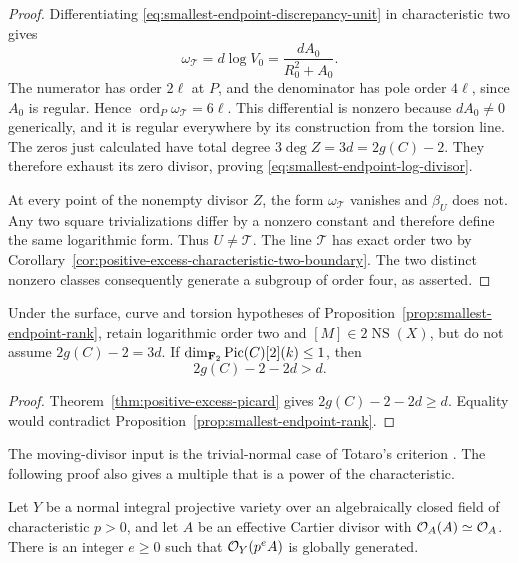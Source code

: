\begin{proof}
Differentiating \eqref{eq:smallest-endpoint-discrepancy-unit} in
characteristic two gives
\begin{equation}\label{eq:smallest-endpoint-discrepancy-log}
 \omega_{\mathcal T}=d\log V_0
      =\frac{dA_0}{R_0^2+A_0}.
\end{equation}
The numerator has order $2\ell$ at $P$, and the denominator has
pole order $4\ell$, since $A_0$ is regular.  Hence
$\operatorname{ord}_P\omega_{\mathcal T}=6\ell$.
This differential is nonzero because $dA_0\ne0$ generically, and it
is regular everywhere by its construction from the torsion line.
The zeros just calculated have total degree
$3\deg Z=3d=2g(C)-2$.  They therefore exhaust its zero divisor,
proving \eqref{eq:smallest-endpoint-log-divisor}.

At every point of the nonempty divisor $Z$, the form
$\omega_{\mathcal T}$ vanishes and $\beta_U$ does not.
Any two square trivializations differ by a nonzero constant and
therefore define the same logarithmic form.  Thus $U\ne\mathcal T$.
The line $\mathcal T$ has exact order two by
Corollary~\ref{cor:positive-excess-characteristic-two-boundary}.
The two distinct nonzero classes consequently generate a subgroup
of order four, as asserted.
\end{proof}

\begin{corollary}\label{cor:smallest-endpoint-rank-strictness}
Under the surface, curve and torsion hypotheses of
Proposition~\ref{prop:smallest-endpoint-rank}, retain logarithmic
order two and $[M]\in2\operatorname{NS}(X)$, but do not assume
$2g(C)-2=3d$.  If $\dim_{\mathbf F_2}\operatorname{Pic}(C)[2](k)\leq1$, then
\[
 2g(C)-2-2d>d.
\]
\end{corollary}

\begin{proof}
Theorem~\ref{thm:positive-excess-picard} gives
$2g(C)-2-2d\geq d$.  Equality would contradict
Proposition~\ref{prop:smallest-endpoint-rank}.
\end{proof}

The moving-divisor input is the trivial-normal case of Totaro's
criterion \cite[Lemma~4.1, pp.~7--8]{TotaroMovingDivisors}.
The following proof also gives a multiple that is a power of the
characteristic.

\begin{lemma}
\label{lem:trivial-normal-moving-divisor}
Let $Y$ be a normal integral projective variety over an algebraically
closed field of characteristic $p>0$, and let $A$ be an effective
Cartier divisor with $\mathcal O_A(A)\simeq\mathcal O_A$.  There is an integer
$e\geq0$ such that $\mathcal O_Y(p^eA)$ is globally generated.
\end{lemma}

